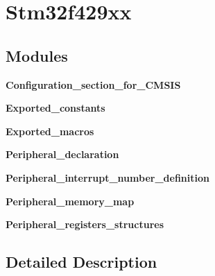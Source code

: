 \section{Stm32f429xx}
\label{group__stm32f429xx}
\subsection*{Modules}
\begin{DoxyCompactItemize}
\item 
\textbf{ Configuration\+\_\+section\+\_\+for\+\_\+\+C\+M\+S\+IS}
\item 
\textbf{ Exported\+\_\+constants}
\item 
\textbf{ Exported\+\_\+macros}
\item 
\textbf{ Peripheral\+\_\+declaration}
\item 
\textbf{ Peripheral\+\_\+interrupt\+\_\+number\+\_\+definition}
\item 
\textbf{ Peripheral\+\_\+memory\+\_\+map}
\item 
\textbf{ Peripheral\+\_\+registers\+\_\+structures}
\end{DoxyCompactItemize}


\subsection{Detailed Description}
